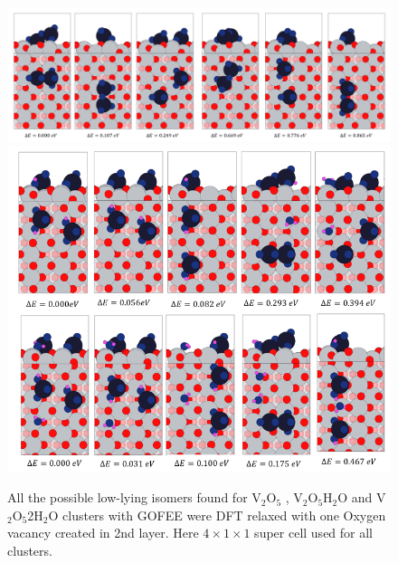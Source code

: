 \documentclass[aip,amsmath,amssymb,reprint, jcp]{revtex4-1}
\begin{document}
\begin{figure}
\centering
\includegraphics[width=1.0\textwidth]{V2O5_TiO2_101sur_4by1supercell.png}
\includegraphics[width=1.0\textwidth]{V2O5_2H2O_H2O_TiO2_101sur_4by1supercell.png}
\caption{All the possible low-lying isomers found for V$_2$O$_5$  , V$_2$O$_5$H$_2$O and V$_2$O$_5$2H$_2$O clusters with GOFEE were DFT relaxed with one Oxygen vacancy created in 2nd layer. Here $4 \times 1 \times 1$ super cell used for all clusters.}
\label{fig:exptobser}
\end{figure}
\end{document}
